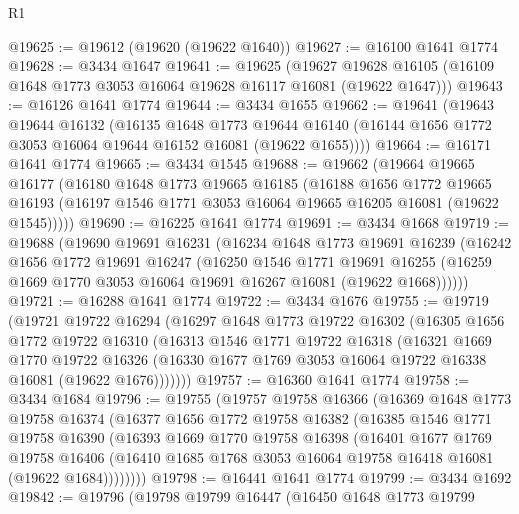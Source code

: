 \begin{lexlean}{R1}
\begin{coremodule}
@19625 := @19612 (@19620 (@19622 @1640))
@19627 := @16100 @1641 @1774
@19628 := @3434 @1647
@19641 := @19625
    (@19627 @19628 @16105 (@16109 @1648 @1773 @3053 @16064 @19628 @16117 @16081 (@19622 @1647)))
@19643 := @16126 @1641 @1774
@19644 := @3434 @1655
@19662 := @19641
    (@19643
      @19644
      @16132
      (@16135
        @1648
        @1773
        @19644
        @16140
        (@16144 @1656 @1772 @3053 @16064 @19644 @16152 @16081 (@19622 @1655))))
@19664 := @16171 @1641 @1774
@19665 := @3434 @1545
@19688 := @19662
    (@19664
      @19665
      @16177
      (@16180
        @1648
        @1773
        @19665
        @16185
        (@16188
          @1656
          @1772
          @19665
          @16193
          (@16197 @1546 @1771 @3053 @16064 @19665 @16205 @16081 (@19622 @1545)))))
@19690 := @16225 @1641 @1774
@19691 := @3434 @1668
@19719 := @19688
    (@19690
      @19691
      @16231
      (@16234
        @1648
        @1773
        @19691
        @16239
        (@16242
          @1656
          @1772
          @19691
          @16247
          (@16250
            @1546
            @1771
            @19691
            @16255
            (@16259 @1669 @1770 @3053 @16064 @19691 @16267 @16081 (@19622 @1668))))))
@19721 := @16288 @1641 @1774
@19722 := @3434 @1676
@19755 := @19719
    (@19721
      @19722
      @16294
      (@16297
        @1648
        @1773
        @19722
        @16302
        (@16305
          @1656
          @1772
          @19722
          @16310
          (@16313
            @1546
            @1771
            @19722
            @16318
            (@16321
              @1669
              @1770
              @19722
              @16326
              (@16330 @1677 @1769 @3053 @16064 @19722 @16338 @16081 (@19622 @1676)))))))
@19757 := @16360 @1641 @1774
@19758 := @3434 @1684
@19796 := @19755
    (@19757
      @19758
      @16366
      (@16369
        @1648
        @1773
        @19758
        @16374
        (@16377
          @1656
          @1772
          @19758
          @16382
          (@16385
            @1546
            @1771
            @19758
            @16390
            (@16393
              @1669
              @1770
              @19758
              @16398
              (@16401
                @1677
                @1769
                @19758
                @16406
                (@16410 @1685 @1768 @3053 @16064 @19758 @16418 @16081 (@19622 @1684))))))))
@19798 := @16441 @1641 @1774
@19799 := @3434 @1692
@19842 := @19796
    (@19798
      @19799
      @16447
      (@16450
        @1648
        @1773
        @19799

\end{coremodule}
\end{lexlean}
